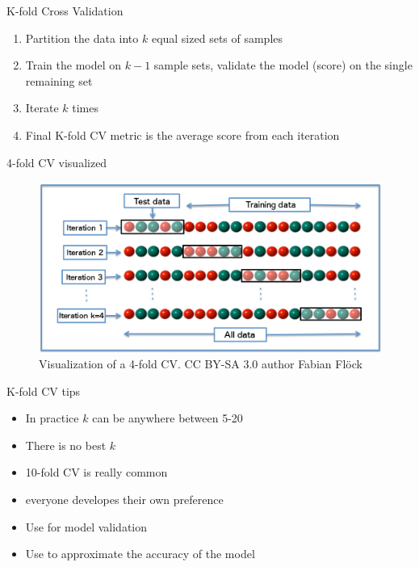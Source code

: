 \documentclass[10pt]{beamer}
\begin{document}
\begin{frame}{K-fold Cross Validation}
\begin{enumerate}
\item Partition the data into $k$ equal sized sets of samples 
\item Train the model on $k-1$ sample sets, validate the model (score) on the single remaining set
\item Iterate $k$ times
\item Final K-fold CV metric is the average score from each iteration
\end{enumerate}
\end{frame}

\begin{frame}{4-fold CV visualized}
\begin{figure}
\includegraphics[width=1.0\textwidth]{figs/cv.jpg}
\caption{Visualization of a 4-fold CV. CC BY-SA 3.0 author Fabian Fl\"ock }
\end{figure}
\end{frame}

\begin{frame}{K-fold CV tips}
\begin{itemize}
\item In practice $k$ can be anywhere between 5-20
\item There is no best $k$
\item 10-fold CV is really common
\item everyone developes their own preference
\item Use for model validation
\item Use to approximate the accuracy of the model
\end{itemize}
\end{frame}
\end{document}
